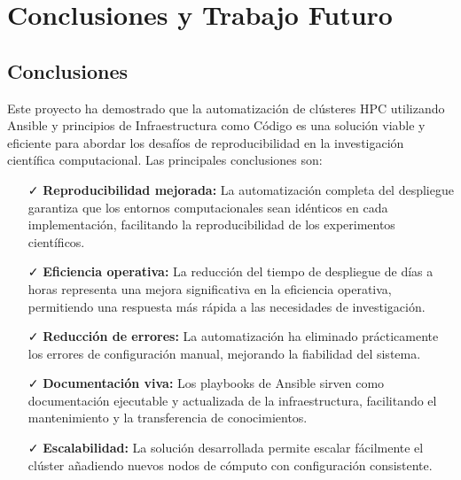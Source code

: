 \documentclass[12pt,a4paper]{report}
\begin{document}
\chapter{Conclusiones y Trabajo Futuro}

\section{Conclusiones}

\begin{tcolorbox}[
  colback=cientigo-blue!5,
  colframe=cientigo-blue,
  arc=2mm,
  boxrule=0.5pt,
  title=\textbf{Conclusiones},
  fonttitle=\bfseries\color{white},
  coltitle=cientigo-blue,
  attach boxed title to top center={yshift=-2mm},
  boxed title style={colback=cientigo-blue}
]
Este proyecto ha demostrado que la automatización de clústeres HPC utilizando Ansible y principios de Infraestructura como Código es una solución viable y eficiente para abordar los desafíos de reproducibilidad en la investigación científica computacional. Las principales conclusiones son:

\begin{itemize}
    \item[\textcolor{cientigo-green}{\faCheck}] \textbf{Reproducibilidad mejorada:} La automatización completa del despliegue garantiza que los entornos computacionales sean idénticos en cada implementación, facilitando la reproducibilidad de los experimentos científicos.
    
    \item[\textcolor{cientigo-green}{\faCheck}] \textbf{Eficiencia operativa:} La reducción del tiempo de despliegue de días a horas representa una mejora significativa en la eficiencia operativa, permitiendo una respuesta más rápida a las necesidades de investigación.
    
    \item[\textcolor{cientigo-green}{\faCheck}] \textbf{Reducción de errores:} La automatización ha eliminado prácticamente los errores de configuración manual, mejorando la fiabilidad del sistema.
    
    \item[\textcolor{cientigo-green}{\faCheck}] \textbf{Documentación viva:} Los playbooks de Ansible sirven como documentación ejecutable y actualizada de la infraestructura, facilitando el mantenimiento y la transferencia de conocimientos.
    
    \item[\textcolor{cientigo-green}{\faCheck}] \textbf{Escalabilidad:} La solución desarrollada permite escalar fácilmente el clúster añadiendo nuevos nodos de cómputo con configuración consistente.
\end{itemize}
\end{tcolorbox}
\end{document}
